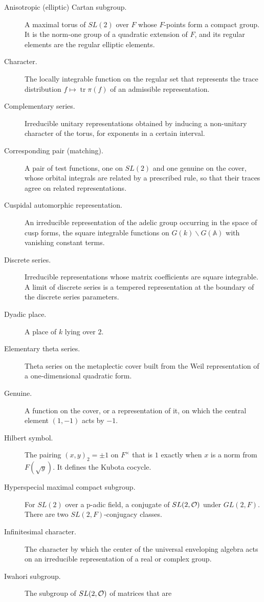 \documentclass[12pt,letterpaper]{book}
\theoremstyle{plain}
\theoremstyle{definition}
\theoremstyle{remark}
\theoremstyle{remark}
\newcommand{\tr}{\operatorname{tr}}
\begin{document}
\begin{description}
\item[Anisotropic (elliptic) Cartan subgroup.] A maximal torus of $SL(2)$
over $F$ whose $F$-points form a compact group. It is the norm-one group of
a quadratic extension of $F$, and its regular elements are the regular
elliptic elements.
\item[Character.] The locally integrable function on the regular set that
represents the trace distribution $f\mapsto\tr\pi(f)$ of an admissible
representation.
\item[Complementary series.] Irreducible unitary representations obtained
by inducing a non-unitary character of the torus, for exponents in a
certain interval.
\item[Corresponding pair (matching).] A pair of test functions, one on
$SL(2)$ and one genuine on the cover, whose orbital integrals are related by
a prescribed rule, so that their traces agree on related representations.
\item[Cuspidal automorphic representation.] An irreducible representation
of the adelic group occurring in the space of cusp forms, the square
integrable functions on $G(k)\backslash G({\mathbb A})$ with vanishing constant
terms.
\item[Discrete series.] Irreducible representations whose matrix
coefficients are square integrable. A limit of discrete series is a
tempered representation at the boundary of the discrete series parameters.
\item[Dyadic place.] A place of $k$ lying over $2$.
\item[Elementary theta series.] Theta series on the metaplectic cover
built from the Weil representation of a one-dimensional quadratic form.
\item[Genuine.] A function on the cover, or a representation of it, on
which the central element $(1,-1)$ acts by $-1$.
\item[Hilbert symbol.] The pairing $(x,y)_2=\pm1$ on $F^\times$ that is $1$
exactly when $x$ is a norm from $F(\sqrt y)$. It defines the Kubota
cocycle.
\item[Hyperspecial maximal compact subgroup.] For $SL(2)$ over a p-adic
field, a conjugate of $SL(2,{\cal O})$ under $GL(2,F)$. There are two
$SL(2,F)$-conjugacy classes.
\item[Infinitesimal character.] The character by which the center of the
universal enveloping algebra acts on an irreducible representation of a
real or complex group.
\item[Iwahori subgroup.] The subgroup of $SL(2,{\cal O})$ of matrices that are

\end{description}
\end{document}
